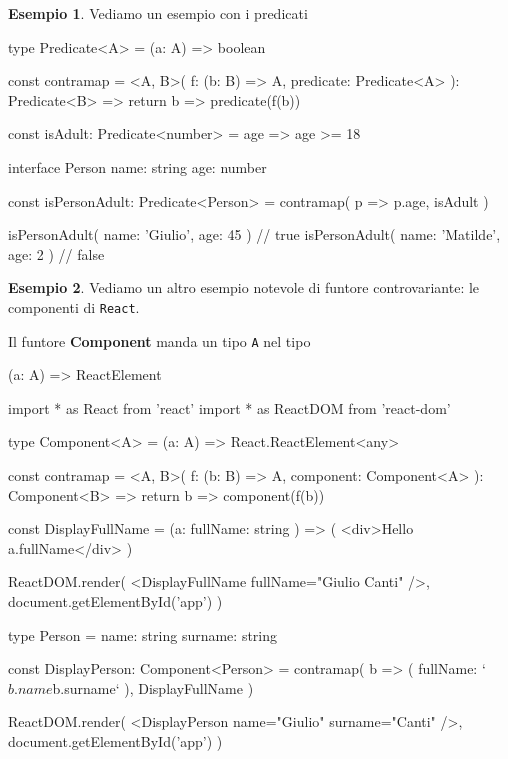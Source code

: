 \documentclass[12pt]{article}
\theoremstyle{definition}
\newtheorem{example}{Esempio}[section]
\newenvironment{code}
  {\vspace{0.5cm} \VerbatimEnvironment\begin{typescriptcode}}
  {\end{typescriptcode} \vspace{0.2cm}}
\begin{document}
\begin{example}
Vediamo un esempio con i predicati

\begin{code}
type Predicate<A> = (a: A) => boolean

const contramap = <A, B>(
  f: (b: B) => A,
  predicate: Predicate<A>
): Predicate<B> => {
  return b => predicate(f(b))
}

const isAdult: Predicate<number> = age => age >= 18

interface Person {
  name: string
  age: number
}

const isPersonAdult: Predicate<Person> = contramap(
  p => p.age,
  isAdult
)

isPersonAdult({ name: 'Giulio', age: 45 }) // true
isPersonAdult({ name: 'Matilde', age: 2 }) // false
\end{code}
\end{example}

\begin{example}
Vediamo un altro esempio notevole di funtore controvariante: le componenti di \texttt{React}.

Il funtore \textbf{Component} manda un tipo \texttt{A} nel tipo

\begin{code}
(a: A) => ReactElement
\end{code}

\begin{code}
import * as React from 'react'
import * as ReactDOM from 'react-dom'

type Component<A> = (a: A) => React.ReactElement<any>

const contramap = <A, B>(
  f: (b: B) => A,
  component: Component<A>
): Component<B> => {
  return b => component(f(b))
}

const DisplayFullName = (a: { fullName: string }) => (
  <div>Hello {a.fullName}</div>
)

ReactDOM.render(
  <DisplayFullName fullName="Giulio Canti" />,
  document.getElementById('app')
)

type Person = {
  name: string
  surname: string
}

const DisplayPerson: Component<Person> = contramap(
  b => ({ fullName: `${b.name} ${b.surname}` }),
  DisplayFullName
)

ReactDOM.render(
  <DisplayPerson name="Giulio" surname="Canti" />,
  document.getElementById('app')
)
\end{code}
\end{example}
\end{document}
